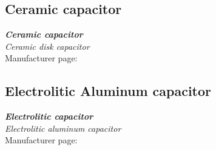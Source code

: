 \subsection{Ceramic capacitor}
\label{datasheet_CERAMIC_CAPACITOR}
\emph{\textbf{Ceramic capacitor}}\\
\emph{Ceramic disk capacitor}\\
\vspace{5pt}
Manufacturer page:	\\


\subsection{Electrolitic Aluminum capacitor}
\label{datasheet_ELECTROLITIC_CAPACITOR}
\emph{\textbf{Electrolitic capacitor}}\\
\emph{Electrolitic aluminum capacitor}\\
\vspace{5pt}
Manufacturer page:	\\








